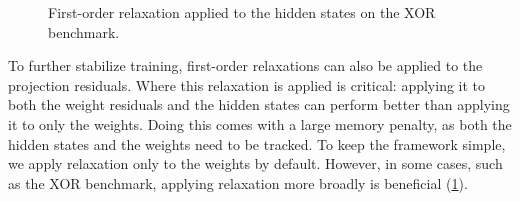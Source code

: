 \begin{figure}[ht]
    \centering
    \begin{minipage}{0.45\textwidth}
        \centering
        \caption{Replacing hard target-assignment with a proximal-loss step accelerates convergence.}
        \label{fig:effect-of-loss}
    \end{minipage}
    \hfill %
    \begin{minipage}{0.45\textwidth}
        \centering
        \caption{First-order relaxation applied to the hidden states on the XOR benchmark.}
        \label{fig:relaxation-location}
    \end{minipage}
\end{figure}
To further stabilize training, first-order relaxations can also be applied to the projection residuals. Where this relaxation is applied is critical: applying it to both the weight residuals and the hidden states can perform better than applying it to only the weights. Doing this comes with a large memory penalty, as both the hidden states and the weights need to be tracked. To keep the framework simple, we apply relaxation only to the weights by default. However, in some cases, such as the XOR benchmark, applying relaxation more broadly is beneficial (\cref{fig:relaxation-location}).

